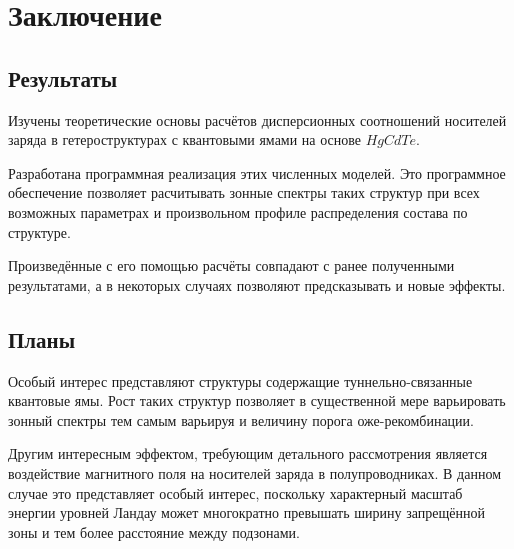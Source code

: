 \documentclass[../main.tex]{subfiles}
\begin{document}
\chapter{Заключение}

\section{Результаты}

    Изучены теоретические основы расчётов дисперсионных соотношений носителей заряда в
    гетероструктурах с квантовыми ямами на основе $HgCdTe$.

    Разработана программная реализация этих численных моделей.
    Это программное обеспечение позволяет расчитывать зонные спектры таких структур при 
    всех возможных параметрах и произвольном профиле распределения состава по структуре.

    Произведённые с его помощью расчёты совпадают с ранее полученными результатами, а 
    в некоторых случаях позволяют предсказывать и новые эффекты.
    
\section{Планы}

    Особый интерес представляют структуры содержащие туннельно-связанные квантовые ямы.
    Рост таких структур позволяет в существенной мере варьировать зонный спектры
    тем самым варьируя и величину порога оже-рекомбинации.

    Другим интересным эффектом, требующим детального рассмотрения является воздействие 
    магнитного поля на носителей заряда в полупроводниках. В данном случае это представляет
    особый интерес, поскольку характерный масштаб энергии уровней Ландау может многократно 
    превышать ширину запрещённой зоны и тем более расстояние между подзонами.
\end{document}
